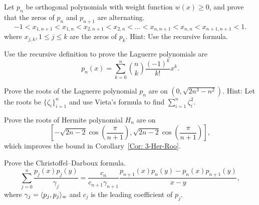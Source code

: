 \begin{problem}[interlacing]
    Let $p_n$ be orthogonal polynomials with weight function $w(x)\ge 0$, and prove that the zeros of $p_n$ and $p_{n+1}$ are alternating. 
    \begin{equation}
        -1 < x_{1, n+1} < x_{1, n} < x_{2,n+1} < x_{2,n}<\dots < x_{n,n+1} < x_{n, n} < x_{n+1, n+1} < 1.
    \end{equation}
    where $x_{j, k}, 1\le j\le k$ are the zeros of $p_k$. Hint: Use the recursive formula.
\end{problem}
\begin{problem}
\label{Prb: 3-Exe-Lag}
    Use the recursive definition to prove the Laguerre polynomials are 
    \begin{equation}
        p_n(x) = \sum_{k=0}^n \binom{n}{k} \frac{(-1)^k}{k!} x^k.
    \end{equation}
\end{problem}
\begin{problem}
\label{Prb: 3-Exe-5}
    Prove the roots of the Laguerre polynomial $p_n$ are on $(0, \sqrt{2n^3 - n^2})$. Hint: Let the roots be $\{\zeta_i\}_{i=1}^n$ and use Vieta's formula to find $\sum_{i=1}^n \zeta_i^2$. 
\end{problem}

\begin{problem}
    Prove the roots of Hermite polynomial $H_n$ are on $$\left[-\sqrt{2n-2}\cos\left(\frac{\pi}{n+1}\right), \sqrt{2n-2}\cos\left(\frac{\pi}{n+1}\right)\right],$$ which improves the bound in Corollary~\ref{Cor: 3-Her-Roo}.
\end{problem}

\begin{problem}
    Prove the Christoffel–Darboux formula. 
    \begin{equation*}
        \sum_{j=0}^n \frac{p_j(x) p_j(y)}{\gamma_j} = \frac{c_{n}}{c_{n+1}\gamma_{n+1}} \frac{p_{n+1}(x)p_n(y) - p_{n}(x)p_{n+1}(y)}{x - y}, 
    \end{equation*}
    where $\gamma_j = \langle {p_j, p_j} \rangle_w$ and $c_j$ is the leading coefficient of $p_j$.
\end{problem}

